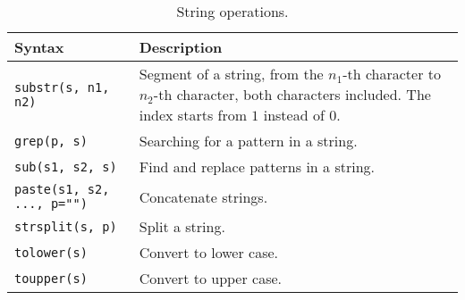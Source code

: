 \begin{table}
  \centering \caption{String operations.}\label{ch:r1:tab:stringoperation}
  \begin{tabularx}{\textwidth}{lX}
    \hline
    Syntax & Description \\ \hline
    \verb|substr(s, n1, n2)| & Segment of a string, from the $n_1$-th character to $n_2$-th character, both characters included. The index starts from $1$ instead of $0$. \\
    \verb|grep(p, s)| & Searching for a pattern in a string. \\
    \verb|sub(s1, s2, s)| & Find and replace patterns in a string. \\
    \verb|paste(s1, s2, ..., p="")| & Concatenate strings. \\
    \verb|strsplit(s, p)| & Split a string. \\
    \verb|tolower(s)| & Convert to lower case. \\
    \verb|toupper(s)| & Convert to upper case. \\
    \hline
  \end{tabularx}
\end{table}

